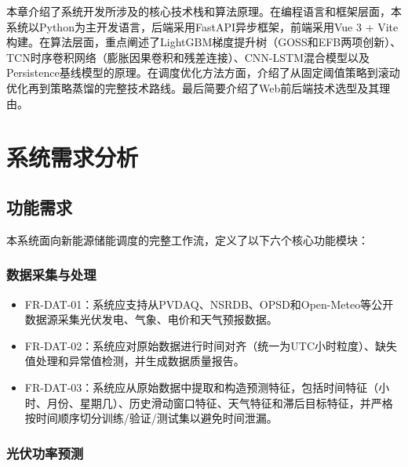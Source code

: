 \documentclass[12pt,a4paper]{ctexbook}
\begin{document}
本章介绍了系统开发所涉及的核心技术栈和算法原理。在编程语言和框架层面，本系统以Python为主开发语言，后端采用FastAPI异步框架，前端采用Vue 3 + Vite构建。在算法层面，重点阐述了LightGBM梯度提升树（GOSS和EFB两项创新）、TCN时序卷积网络（膨胀因果卷积和残差连接）、CNN-LSTM混合模型以及Persistence基线模型的原理。在调度优化方法方面，介绍了从固定阈值策略到滚动优化再到策略蒸馏的完整技术路线。最后简要介绍了Web前后端技术选型及其理由。

\chapter{系统需求分析}

\section{功能需求}

本系统面向新能源储能调度的完整工作流，定义了以下六个核心功能模块：

\subsection{数据采集与处理}

\begin{itemize}
  \item FR-DAT-01：系统应支持从PVDAQ、NSRDB、OPSD和Open-Meteo等公开数据源采集光伏发电、气象、电价和天气预报数据。\cite{pvdaq-nrel,nsrdb-nrel,opsd-datapackage-2020,opsd-wiese-2019,open-meteo-2023}
  \item FR-DAT-02：系统应对原始数据进行时间对齐（统一为UTC小时粒度）、缺失值处理和异常值检测，并生成数据质量报告。
  \item FR-DAT-03：系统应从原始数据中提取和构造预测特征，包括时间特征（小时、月份、星期几）、历史滑动窗口特征、天气特征和滞后目标特征，并严格按时间顺序切分训练/验证/测试集以避免时间泄漏。\cite{scikit-learn-2011,pv-deep-review-2025}
\end{itemize}

\subsection{光伏功率预测}
\end{document}

